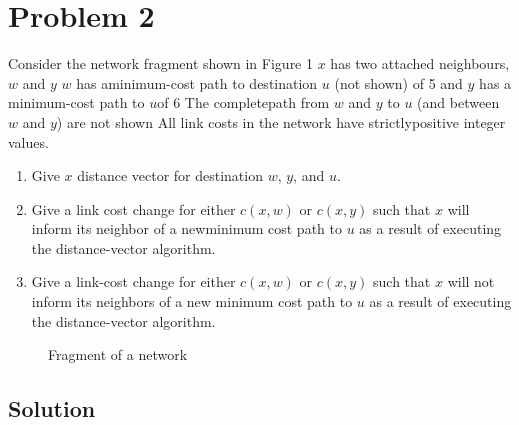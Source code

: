 \section*{Problem 2}

Consider the network fragment shown in Figure 1
$x$ has two attached neighbours, $w$ and $y$
$w$ has aminimum-cost path to destination $u$ (not shown) of 5 and $y$ has a minimum-cost path to $u$of 6
The completepath from $w$ and $y$ to $u$ (and between $w$ and $y$) are not shown
All link costs in the network have strictlypositive integer values.

\begin{enumerate}
    \item Give $x$ distance vector for destination $w$, $y$, and $u$.
    \item Give a link cost change for either $c(x, w)$ or $c(x, y)$ such that $x$ will inform its neighbor of a newminimum cost path to $u$ as a result of executing the distance-vector algorithm.
    \item Give a link-cost change for either $c(x, w)$ or $c(x, y)$ such that $x$ will not inform its neighbors of a new minimum cost path to $u$ as a result of executing the distance-vector algorithm.
\end{enumerate}

\begin{figure}[H]
    \centering
    \caption{Fragment of a network}
\end{figure}

\subsection*{Solution}